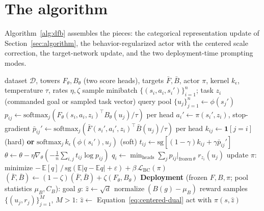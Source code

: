 \documentclass[11pt]{article}
\begin{document}
{\section{The algorithm}

Algorithm~\ref{alg:dfb} assembles the pieces: the categorical representation update of Section~\ref{sec:algorithm}, the behavior-regularized actor with the centered scale correction, the target-network update, and the two deployment-time prompting modes.

\begin{algorithm}[h]
\caption{Density-FB (hard or soft immediate target)}
\label{alg:dfb}
\begin{algorithmic}[1]
\Require dataset $\mathcal D$, towers $F_\theta, B_\theta$ (two score heads), targets $\bar F, \bar B$, actor $\pi$, kernel $k_\epsilon$, temperature $\tau$, rates $\eta, \zeta$
    \State sample minibatch $\{(s_i,a_i,s_i')\}_{i=1}^{n}$; task $z_i$ (commanded goal or sampled task vector)
    \State query pool $\{u_j\}_{j=1}^{n} \gets \phi(s_j')$ 
    \State $p_{ij} \gets \mathrm{softmax}_j\!\left( F_\theta(s_i,a_i,z_i)^\top B_\theta(u_j)/\tau \right)$ per head
    \State $a_i' \gets \pi(s_i', z_i)$, stop-gradient 
    \State $\bar p_{ij}' \gets \mathrm{softmax}_j\!\left( \bar F(s_i',a_i',z_i)^\top \bar B(u_j)/\tau \right)$ per head
    \State $k_{ij} \gets \mathbf 1[j=i]$ (hard) \textbf{or} $\mathrm{softmax}_j\, k_\epsilon(\phi(s_i'), u_j)$ (soft)
    \State $t_{ij} \gets \mathrm{sg}\!\left[ (1-\gamma) k_{ij} + \gamma \bar p_{ij}' \right]$
    \State $\theta \gets \theta - \eta \nabla_\theta \left( -\tfrac1n \sum_{i,j} t_{ij} \log p_{ij} \right)$ 
    \State $q_i \gets \min_{\text{heads}} \sum_j p_{ij}\big|_{\mathrm{frozen}\ \theta}\; r_{z_i}(u_j)$ 
    \State update $\pi$: minimize $-\,\mathbb E[q] \,/\, \mathrm{sg}\!\left(\mathbb E|q - \mathbb E q| + \varepsilon\right) + \beta\,\mathcal L_{\mathrm{BC}}(\pi)$
    \State $(\bar F, \bar B) \gets (1-\zeta)(\bar F, \bar B) + \zeta (F_\theta, B_\theta)$
\EndFor
\Statex \textbf{Deployment} (frozen $F, B, \pi$; pool statistics $\mu_B, C_B$):
\State goal $g$: \quad $\hat z \gets \sqrt d\,\operatorname{normalize}(B(g) - \mu_B)$ 
\State reward samples $\{(u_j, r_j)\}_{j=1}^{M}$, $M>1$: \quad $\hat z \gets$ Equation~\eqref{eq:centered-dual} 
\State act with $\pi(s, \hat z)$
\end{algorithmic}
\end{algorithm}
}
\end{document}
